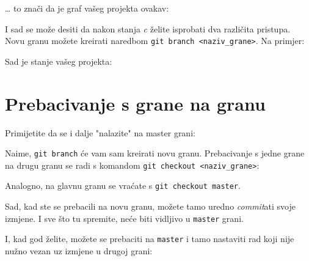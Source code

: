 \dots{} to znači da je graf vašeg projekta ovakav:



I sad se može desiti da nakon stanja \emph c želite isprobati dva različita pristupa.
Novu granu možete kreirati naredbom \verb+git branch <naziv_grane>+.
Na primjer:


Sad je stanje vašeg projekta:



\section*{Prebacivanje s grane na granu}

Primijetite da se i dalje "nalazite" na master grani:



Naime, \verb+git branch+ će vam sam kreirati novu granu.
Prebacivanje s jedne grane na drugu granu se radi s komandom \verb+git checkout <naziv_grane>+:



Analogno, na glavnu granu se vraćate s \verb+git checkout master+.

Sad, kad ste se prebacili na novu granu, možete tamo uredno \emph{commit}ati svoje izmjene. 
I sve što tu spremite, neće biti vidljivo u \verb+master+ grani.



I, kad god želite, možete se prebaciti na \verb+master+ i tamo nastaviti rad koji nije nužno vezan uz izmjene u drugoj grani:





